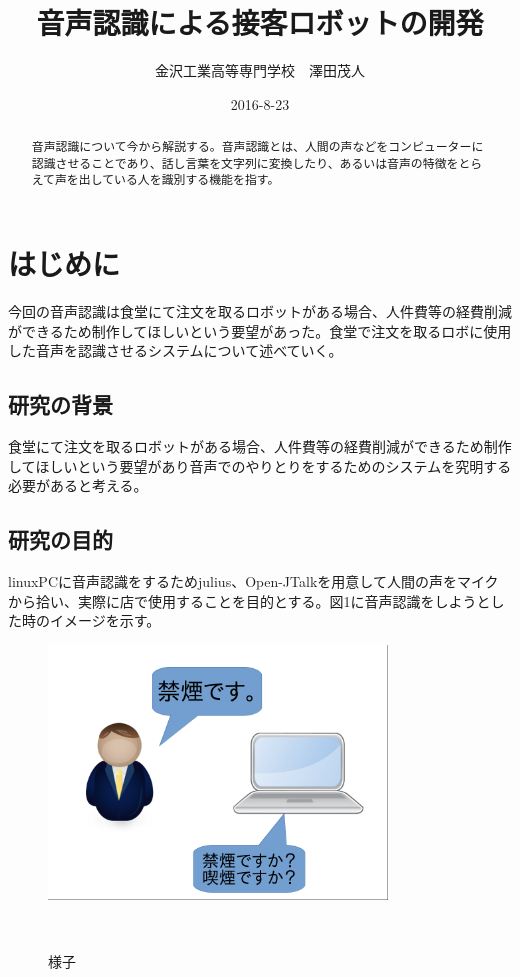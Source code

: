 \documentclass[11pt]{jsarticle}
\title{音声認識による接客ロボットの開発}
\author{金沢工業高等専門学校　澤田茂人}
\date{2016-8-23}
\begin{document}
\maketitle
\begin{abstract}
音声認識について今から解説する。音声認識とは、人間の声などをコンピューターに認識させることであり、話し言葉を文字列に変換したり、あるいは音声の特徴をとらえて声を出している人を識別する機能を指す。

\end{abstract}

\tableofcontents
\section{はじめに}
今回の音声認識は食堂にて注文を取るロボットがある場合、人件費等の経費削減ができるため制作してほしいという要望があった。食堂で注文を取るロボに使用した音声を認識させるシステムについて述べていく。

\subsection{研究の背景}
食堂にて注文を取るロボットがある場合、人件費等の経費削減ができるため制作してほしいという要望があり音声でのやりとりをするためのシステムを究明する必要があると考える。

\subsection{研究の目的}
linuxPCに音声認識をするためjulius、Open-JTalkを用意して人間の声をマイクから拾い、実際に店で使用することを目的とする。図1に音声認識をしようとした時のイメージを示す。


\begin{figure}[b]
 \begin{center}
  \includegraphics[width=90mm]{sukusho.png}
 　\caption{様子}
 　\label{fig:kinshi}
 \end{center}
\end{figure}
\end{document}
